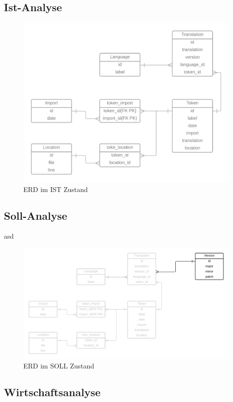\documentclass[oneside]{article}
\begin{document}
  \subsection{Ist-Analyse}
  \begin{figure}[h]
    \centering
    \includegraphics[width=\textwidth]{ERD_TranslationService_IST-Analyse.png}
    \caption{ERD im IST Zustand}
  \end{figure}
  \newpage
  \subsection{Soll-Analyse}
  asd
  \begin{figure}[h]
    \centering
    \includegraphics[width=\textwidth]{ERD_TranslationService_SOLL-Analyse.png}
    \caption{ERD im SOLL Zustand}
  \end{figure}  \subsection{Wirtschaftsanalyse}
\end{document}
